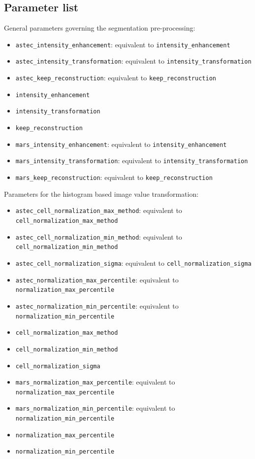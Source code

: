 \subsection{Parameter list}

General parameters governing the segmentation pre-processing:
\begin{itemize}
\itemsep -0.5ex
\item \texttt{astec\_intensity\_enhancement}: equivalent to
      \texttt{intensity\_enhancement}
\item \texttt{astec\_intensity\_transformation}: equivalent to
      \texttt{intensity\_transformation}
\item \texttt{astec\_keep\_reconstruction}: equivalent to
      \texttt{keep\_reconstruction}
\item \texttt{intensity\_enhancement}
\item \texttt{intensity\_transformation}
\item \texttt{keep\_reconstruction}
\item \texttt{mars\_intensity\_enhancement}: equivalent to
      \texttt{intensity\_enhancement}
\item \texttt{mars\_intensity\_transformation}: equivalent to
      \texttt{intensity\_transformation}
\item \texttt{mars\_keep\_reconstruction}: equivalent to
      \texttt{keep\_reconstruction}
\end{itemize}

Parameters for the histogram based image value transformation:
\begin{itemize}
\itemsep -0.5ex
\item \texttt{astec\_cell\_normalization\_max\_method}: equivalent to
      \texttt{cell\_normalization\_max\_method}
\item \texttt{astec\_cell\_normalization\_min\_method}: equivalent to
      \texttt{cell\_normalization\_min\_method}
\item \texttt{astec\_cell\_normalization\_sigma}: equivalent to
      \texttt{cell\_normalization\_sigma}
\item \texttt{astec\_normalization\_max\_percentile}: equivalent to
      \texttt{normalization\_max\_percentile}
\item \texttt{astec\_normalization\_min\_percentile}: equivalent to
      \texttt{normalization\_min\_percentile}
\item \texttt{cell\_normalization\_max\_method}
\item \texttt{cell\_normalization\_min\_method}
\item \texttt{cell\_normalization\_sigma}
\item \texttt{mars\_normalization\_max\_percentile}: equivalent to
      \texttt{normalization\_max\_percentile}
\item \texttt{mars\_normalization\_min\_percentile}: equivalent to
      \texttt{normalization\_min\_percentile}
\item \texttt{normalization\_max\_percentile}
\item \texttt{normalization\_min\_percentile}
\end{itemize}

